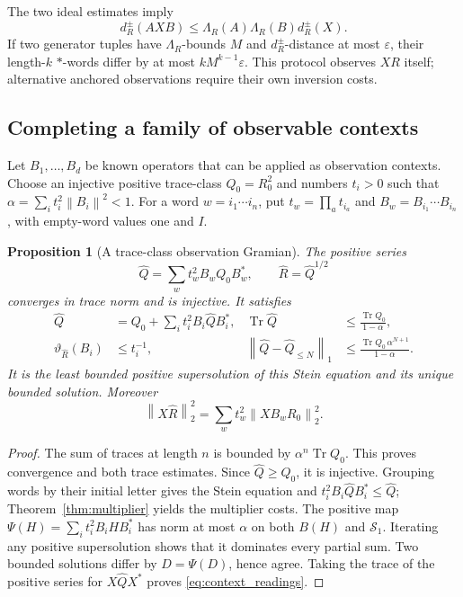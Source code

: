 \documentclass[11pt,a4paper]{amsart}
\numberwithin{equation}{section}
\newtheorem{proposition}[theorem]{Proposition}
\theoremstyle{definition}
\theoremstyle{remark}
\newcommand{\Sch}{\mathcal S}
\DeclareMathOperator{\Tr}{Tr}
\newcommand{\norm}[1]{\left\lVert#1\right\rVert}
\begin{document}
The two ideal estimates imply
\begin{equation}\label{eq:twosidedmodule}
 d_R^{\pm}(AXB)\le\Lambda_R(A)\Lambda_R(B)d_R^{\pm}(X).
\end{equation}
If two generator tuples have $\Lambda_R$-bounds $M$ and $d_R^{\pm}$-distance at most $\varepsilon$, their length-$k$ $*$-words differ by at most $kM^{k-1}\varepsilon$. This protocol observes $XR$ itself; alternative anchored observations require their own inversion costs.

\subsection{Completing a family of observable contexts}
Let $B_1,\ldots,B_d$ be known operators that can be applied as observation contexts. Choose an injective positive trace-class $Q_0=R_0^2$ and numbers $t_i>0$ such that
$\alpha=\sum_it_i^2\norm{B_i}^2<1$.
For a word $w=i_1\cdots i_n$, put $t_w=\prod_at_{i_a}$ and $B_w=B_{i_1}\cdots B_{i_n}$, with empty-word values one and $I$.
\begin{proposition}[A trace-class observation Gramian]\label{prop:context_completion}
The positive series
\begin{equation}\label{eq:context_gramian}
 \widehat Q=\sum_wt_w^2B_wQ_0B_w^*,\qquad \widehat R=\widehat Q^{1/2}
\end{equation}
converges in trace norm and is injective. It satisfies
\begin{align}
 \widehat Q&=Q_0+\sum_it_i^2B_i\widehat QB_i^*,&
 \Tr\widehat Q&\le\frac{\Tr Q_0}{1-\alpha},\label{eq:context_stein}\\
 \vartheta_{\widehat R}(B_i)&\le t_i^{-1},&
 \norm{\widehat Q-\widehat Q_{\le N}}_1
 &\le\frac{\Tr Q_0\,\alpha^{N+1}}{1-\alpha}.\label{eq:context_cost}
\end{align}
It is the least bounded positive supersolution of this Stein equation and its unique bounded solution. Moreover
\begin{equation}\label{eq:context_readings}
 \norm{X\widehat R}_2^2=\sum_wt_w^2\norm{XB_wR_0}_2^2.
\end{equation}
\end{proposition}
\begin{proof}
The sum of traces at length $n$ is bounded by $\alpha^n\Tr Q_0$. This proves convergence and both trace estimates. Since $\widehat Q\ge Q_0$, it is injective. Grouping words by their initial letter gives the Stein equation and
$t_i^2B_i\widehat QB_i^*\le\widehat Q$;
Theorem~\ref{thm:multiplier} yields the multiplier costs. The positive map
$\Psi(H)=\sum_it_i^2B_iHB_i^*$
has norm at most $\alpha$ on both $B(H)$ and $\Sch_1$. Iterating any positive supersolution shows that it dominates every partial sum. Two bounded solutions differ by $D=\Psi(D)$, hence agree. Taking the trace of the positive series for $X\widehat QX^*$ proves \eqref{eq:context_readings}.
\end{proof}
\end{document}
